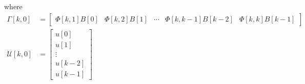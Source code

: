 \documentclass[twoside]{article}
\begin{document}
%
where
%
\begin{align*}
    \Gamma[k,0] &= \left[ \begin{array}{c|c|c|c|c} \Phi[k,1] B[0] & \Phi[k,2] B[1]  & \cdots & \Phi[k,k-1] B[k-2]  & \Phi[k,k] B[k-1] \end{array} \right]
\\
    \mathcal{U}[k,0] &=  \left[ \begin{array}{c} u[0] \\ u[1] \\ \vdots \\ u[k-2] \\ u[k-1]  \end{array} \right]
\end{align*}
%

\end{document}
